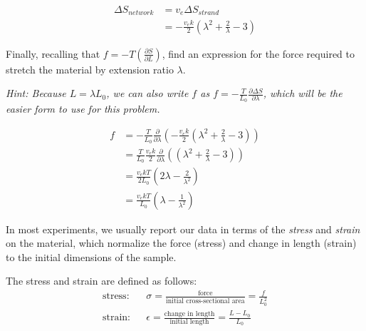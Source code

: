 \begin{activity}
\begin{ctqs}
			\begin{solution}[1.5in]
				\begin{align*}
					\Delta S_{network} &= v_e \Delta S_{strand}\\
						&= -\frac{v_e k}{2}\left(\lambda^2 + \frac{2}{\lambda} - 3\right)
				\end{align*}
			\end{solution}
		
	\question Finally, recalling that $f = -T\left(\frac{\partial S}{\partial L}\right)$, find an expression for the force required to stretch the material by extension ratio $\lambda$.
	
		\emph{Hint: Because $L = \lambda L_0$, we can also write $f$ as $f = -\frac{T}{L_0}\frac{\partial \Delta S}{\partial \lambda}$, which will be the easier form to use for this problem.}
		
			\begin{solution}[3in]
			
				\begin{align*}
					f &= -\frac{T}{L_0}\frac{\partial}{\partial \lambda} \left(-\frac{v_e k}{2}\left(\lambda^2 + \frac{2}{\lambda} - 3\right)\right)\\
						&= \frac{T}{L_0}\frac{v_e k}{2}\frac{\partial}{\partial \lambda} \left(\left(\lambda^2 + \frac{2}{\lambda} - 3\right)\right)\\
						&= \frac{v_e k T}{2 L_0}\left(2\lambda - \frac{2}{\lambda^2} \right)\\
						&= \frac{v_e k T}{L_0}\left(\lambda - \frac{1}{\lambda^2} \right)
				\end{align*}
			\end{solution}
	
\end{ctqs}

\begin{model}

	In most experiments, we usually report our data in terms of the \emph{stress} and \emph{strain} on the material, which normalize the force (stress) and change in length (strain) to the initial dimensions of the sample.
	
	The stress and strain are defined as follows:
	\begin{align*}
		\text{stress:} && \sigma = \frac{\text{force}}{\text{initial cross-sectional area}} = \frac{f}{L_0^2} \\
		\text{strain:} && \epsilon = \frac{\text{change in length}}{\text{initial length}} = \frac{L-L_0}{L_0}
	\end{align*}
	

\end{model}
\end{activity}
